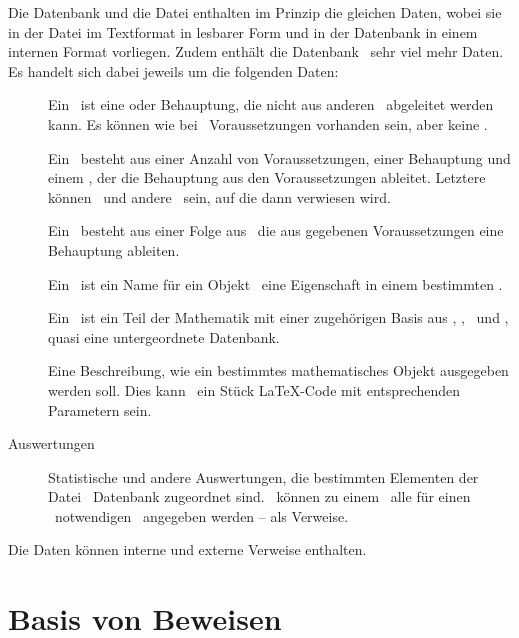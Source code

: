 Die Datenbank und die Datei enthalten im Prinzip die gleichen Daten, wobei sie in der Datei im Textformat in lesbarer Form und in der Datenbank in einem internen Format vorliegen.
Zudem enthält die Datenbank \textiAlg\ sehr viel mehr Daten. Es handelt sich dabei jeweils um die folgenden Daten:
\begin{description}
	\item[\Axiome]         \label{Daten-Axiom}
	Ein \Axiom\ ist eine \emph{\Aussage} oder Behauptung, die nicht aus anderen \Aussagen\ abgeleitet werden kann.
	Es können wie bei \Saetzen\ Voraussetzungen vorhanden sein, aber keine \Beweise.
	\item[\Saetze]          \label{Daten-Satz}
	Ein \Satz\ besteht aus einer Anzahl von Voraussetzungen, einer Behauptung und einem \Beweis, der die Behauptung aus den Voraussetzungen ableitet.
	Letztere können \Axiome\ und andere \Saetze\ sein, auf die dann verwiesen wird.
	\item[\Beweise]        \label{Daten-Beweis}
	Ein \Beweis\ besteht aus einer Folge aus \Beweisschritten\, die aus gegebenen Voraussetzungen eine Behauptung ableiten.
	\item[\Fachbegriffe]   \label{Daten-Fachbegriff}
	Ein \Fachbegriff\ ist ein Name für ein Objekt \textbzw\ eine Eigenschaft in einem bestimmten \Fachgebiet.
	\item[\Fachgebiete]    \label{Daten-Fachgebiet}
	Ein \Fachgebiet\ ist ein Teil der Mathematik mit einer zugehörigen Basis aus \Axiomen, \Saetzen, \Fachbegriffen\ und \Ausgabeschemata, quasi eine untergeordnete Datenbank.
	\item[\Ausgabeschemata] \label{Daten-Ausgabeschema}
	Eine Beschreibung, wie ein bestimmtes mathematisches Objekt ausgegeben werden soll.
	Dies kann \textzB\ ein Stück \LaTeX-Code mit entsprechenden Parametern sein.
	\item[Auswertungen]             \label{Daten-Auswertung}
	Statistische und andere Auswertungen, die bestimmten Elementen der Datei \textbzw\ Datenbank zugeordnet sind.
	\textZB\ können zu einem \Satz\ alle für einen \Beweis\ notwendigen \Axiome\ angegeben werden -- als Verweise.
\end{description}
Die Daten können interne und externe Verweise enthalten.

\section{Basis von Beweisen}
\label{sec-BeweisBasis}


